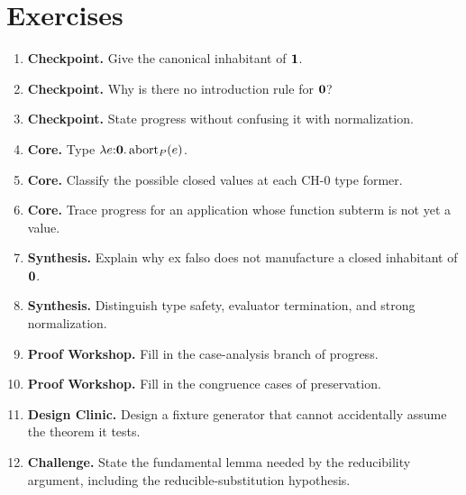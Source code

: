 \section*{Exercises}
\begin{enumerate}[label=\textbf{5.\arabic*.}]
\item \textbf{Checkpoint.} Give the canonical inhabitant of $\mathbf{1}$.
\item \textbf{Checkpoint.} Why is there no introduction rule for $\mathbf{0}$?
\item \textbf{Checkpoint.} State progress without confusing it with normalization.
\item \textbf{Core.} Type $\lambda e{:}\mathbf{0}.\operatorname{abort}_P(e)$.
\item \textbf{Core.} Classify the possible closed values at each $\mathrm{CH}\text{-}0$ type former.
\item \textbf{Core.} Trace progress for an application whose function subterm is not yet a value.
\item \textbf{Synthesis.} Explain why ex falso does not manufacture a closed inhabitant of $\mathbf{0}$.
\item \textbf{Synthesis.} Distinguish type safety, evaluator termination, and strong normalization.
\item \textbf{Proof Workshop.} Fill in the case-analysis branch of progress.
\item \textbf{Proof Workshop.} Fill in the congruence cases of preservation.
\item \textbf{Design Clinic.} Design a fixture generator that cannot accidentally assume the theorem it tests.
\item \textbf{Challenge.} State the fundamental lemma needed by the reducibility argument, including the reducible-substitution hypothesis.
\end{enumerate}
